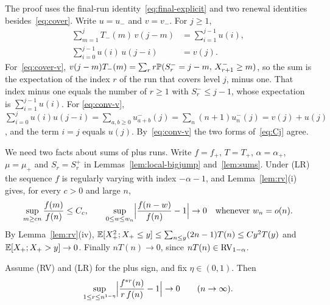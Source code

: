 The proof uses the final-run identity~\eqref{eq:final-explicit} and two renewal
identities besides~\eqref{eq:cover}. Write $u=u_\minus$ and $v=v_\minus$. For $j\ge1$,
\begin{align}
 \sum_{m=1}^{j}T_\minus(m)\,v(j-m)&=\sum_{i=1}^{j-1}u(i),\label{eq:cover-v}\\
 \sum_{i=0}^{j-1}u(i)\,u(j-i)&=v(j).\label{eq:conv-v}
\end{align}
For~\eqref{eq:cover-v}, $v(j-m)T_{-}(m)=\sum_rr\mathbb{P}(S^{-}_r=j-m,\,X^{-}_{r+1}\ge m)$,
so the sum is the expectation of the index $r$ of the run that covers level
$j$, minus one. That index minus one equals the number of $r\ge1$ with
$S^\minus_r\le j-1$, whose expectation is $\sum_{i=1}^{j-1}u(i)$. For
\eqref{eq:conv-v}, $\sum_{i=0}^{j}u(i)u(j-i)=\sum_{a,b\ge0}u^\minus_{a+b}(j)=\sum_n(n+1)u^\minus_n(j)=v(j)+u(j)$,
and the term $i=j$ equals $u(j)$. By~\eqref{eq:conv-v} the two forms
of~\eqref{eq:Cj} agree.

We need two facts about sums of plus runs. Write $f=f_\plus$,
$T=T_\plus$, $\alpha=\alpha_\plus$, $\mu=\mu_\plus$ and $S_r=S^\plus_r$ in
Lemmas~\ref{lem:local-bigjump} and~\ref{lem:sums}. Under (LR) the sequence $f$
is regularly varying with index $-\alpha-1$, and Lemma~\ref{lem:rv}(i) gives, for
every $c>0$ and large $n$,
\begin{equation}\label{eq:f-uct}
 \sup_{m\ge cn}\frac{f(m)}{f(n)}\le C_c,\qquad
 \sup_{0\le w\le w_n}\Bigl|\frac{f(n-w)}{f(n)}-1\Bigr|\to0\quad\text{whenever }w_n=o(n).
\end{equation}
By Lemma~\ref{lem:rv}(iv), $\mathbb{E}[X_{+}^2;X_{+}\le y]\le\sum_{n\le y}(2n-1)T(n)\le Cy^2T(y)$
and $\mathbb{E}[X_{+};X_{+}>y]\to0$. Finally $nT(n)\to0$, since $nT(n)\in\mathrm{RV}_{1-\alpha}$.

\begin{lemma}\label{lem:local-bigjump}
Assume (RV) and (LR) for the plus sign, and fix $\eta\in(0,1)$. Then
\[
 \sup_{1\le r\le n^{1-\eta}}\Bigl|\frac{f^{*r}(n)}{r\,f(n)}-1\Bigr|\to0\qquad(n\to\infty).
\]
\end{lemma}

